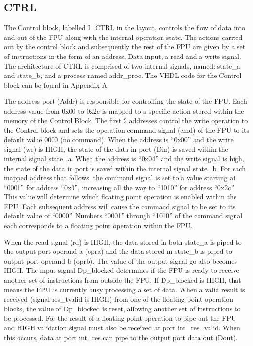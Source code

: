\documentclass[conference]{IEEEtran}
\begin{document}
\subsection{CTRL}
The Control block, labelled I\_CTRL in the layout, controls the flow of data into and out of the FPU along with the internal operation state. The actions carried out by the control block and subsequently the rest of the FPU are given by a set of instructions in the form of an address, Data input, a read and a write signal.  The architecture of CTRL is comprised of two internal signals, named: state\_a and state\_b, and a process named addr\_proc. The VHDL code for the Control block can be found in Appendix A.
\newline

The address port (Addr) is responsible for controlling the state of the FPU. Each address value from 0x00 to 0x2c is mapped to a specific action stored within the memory of the Control Block. The first 2 addresses control the write operation to the Control block and sets the operation command signal (cmd) of the FPU to its default value 0000 (no command). When the address is “0x00” and the write signal (wr) is HIGH, the state of the data in port (Din) is saved within the internal signal state\_a. When the address is “0x04” and the write signal is high, the state of the data in port is saved within the internal signal state\_b. For each mapped address that follows, the command signal is set to a value starting at “0001” for address “0x0”, increasing all the way to “1010” for address “0x2c” This value will determine which floating point operation is enabled within the FPU. Each subsequent address will cause the command signal to be set to its default value of “0000”. Numbers “0001” through “1010” of the command signal each corresponds to a floating point operation within the FPU. 
\newline

When the read signal (rd) is HIGH, the data stored in both state\_a is piped to the output port operand a (opra) and the data stored in state\_b is piped to output port operand b (oprb). The value of the output signal go also becomes HIGH. 
The input signal Dp\_blocked determines if the FPU is ready to receive another set of instructions from outside the FPU. If Dp\_blocked is HIGH, that means the FPU is currently busy processing a set of data. When a valid result is received (signal res\_tvalid is HIGH) from one of the floating point operation blocks, the value of Dp\_blocked is reset, allowing another set of instructions to be processed. For the result of a floating point operation to pipe out the FPU and HIGH validation signal must also be received at port int\_res\_valid. When this occurs, data at port int\_res can pipe to the output port data out (Dout).
\end{document}
